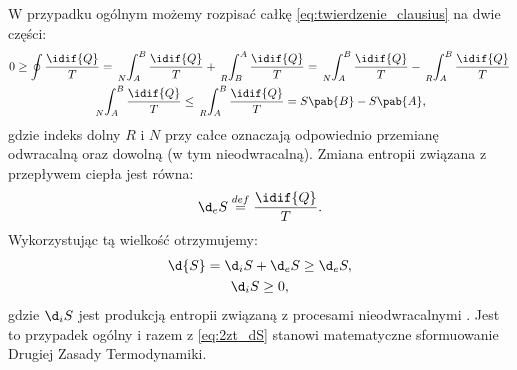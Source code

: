 W przypadku ogólnym możemy rozpisać całkę \eqref{eq:twierdzenie_clausius} na dwie części:
\begin{gather}
	0 \geq \oint \frac{\idif{Q}}{T} = 
	\sideset{_N}{_A^B}{\int} \frac{\idif{Q}}{T} + \sideset{_R}{_B^A}{\int} \frac{\idif{Q}}{T} = 
	\sideset{_N}{_A^B}{\int} \frac{\idif{Q}}{T} - \sideset{_R}{_A^B}{\int} \frac{\idif{Q}}{T} \\
	\sideset{_N}{_A^B}{\int} \frac{\idif{Q}}{T} \leq \sideset{_R}{_A^B}{\int} \frac{\idif{Q}}{T} = S\pab{B} - S\pab{A},
\end{gather}
gdzie indeks dolny \(R\) i \(N\) przy całce oznaczają odpowiednio przemianę odwracalną oraz dowolną (w tym nieodwracalną). Zmiana entropii związana z przepływem ciepła jest równa:
\begin{equation}\label{eq:def_deS}
	\d_e{S} \overset{def}{=} \frac{\idif{Q}}{T}.
\end{equation}
Wykorzystując tą wielkość otrzymujemy:
\begin{gather*}
	\d{S} = \d_i{S} + \d_e{S} \geq \d_e{S}, \\
	\d_i{S} \geq 0,
\end{gather*}
gdzie \(\d_i{S}\) jest produkcją entropii związaną z procesami nieodwracalnymi \cite{guminski}. Jest to przypadek ogólny i razem z \eqref{eq:2zt_dS} stanowi matematyczne sformuowanie Drugiej Zasady Termodynamiki.
